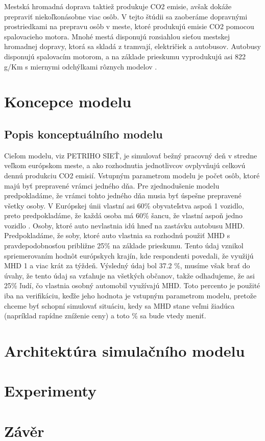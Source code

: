 \documentclass[a4paper, 11pt]{article}
\begin{document}
Mestská hromadná doprava taktiež produkuje CO2 emisie, avšak dokáže prepraviť niekoľkonásobne viac osôb. V tejto štúdii sa zaoberáme dopravnými prostriedkami na prepravu osôb v meste, ktoré produkujú emisie CO2 pomocou spalovacieho motora. Mnohé mestá disponujú rozsiahlou sieťou mestskej hromadnej dopravy, ktorá sa skladá z tramvají, električiek a autobusov. Autobusy disponujú spalovacím motorom, a na základe prieskumu vyprodukujú asi 822 g/Km s miernymi odchýlkami rôznych modelov \cite{bust_travel}. 



\section{Koncepce modelu}

\subsection{Popis konceptuálního modelu}
Cieľom modelu, viz PETRIHO SIEŤ,  je simulovať bežný pracovný deň v stredne veľkom európskom meste, a ako rozhodnutia jednotlivcov ovplyvňujú celkovú dennú produkciu CO2 emisií. Vstupným parametrom modelu je počet osôb, ktoré majú byť prepravené vrámci jedného dňa. Pre zjednodušenie modelu predpokladáme, že vrámci tohto jedného dňa musia byť úspešne prepravené všetky osoby. V Európskej únii vlastní asi 60\% obyvateľstva aspoň 1 vozidlo, preto predpokladáme, že každá osoba má 60\% šancu, že vlastní aspoň jedno vozidlo \cite{rss}. Osoby, ktoré auto nevlastnia idú hneď na zastávku autobusu MHD. Predpokladáme, že soby, ktoré auto vlastnia sa rozhodnú použiť MHD s pravdepodobnosťou približne 25\% na základe prieskumu. Tento údaj vznikol spriemerovaním hodnôt európskych krajín, kde respondenti povedali, že využijú MHD 1 a viac krát za týždeň. Výsledný údaj bol 37.2 \%, musíme však brať do úvahy, že tento údaj sa vzťahuje na všetkých občanov, takže odhadujeme, že asi 25\% ľudí, čo vlastnia osobný automobil využívajú MHD. Toto percento je použité iba na verifikáciu, keďže jeho hodnota je vstupným parametrom modelu, pretože chceme byť schopní simulovať situáciu, kedy sa MHD stane veľmi žiadúca (napríklad rapídne zníženie ceny) a toto \% sa bude vtedy meniť.

\section{Architektúra simulačního modelu}
\section{Experimenty}
\section{Závěr}

\newpage


\end{document}
